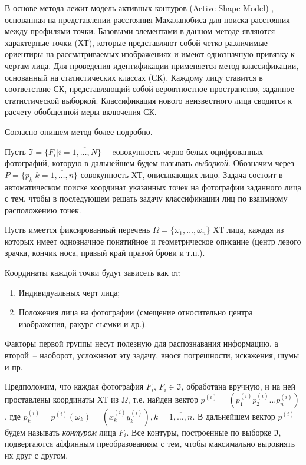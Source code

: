 В основе метода лежит модель активных контуров (Active Shape Model) \cite{main_counters}, основанная на представлении
расстояния Махаланобиса для поиска расстояния между 
профилями точки. Базовыми элементами в данном методе
являются характерные точки (ХТ), которые представляют собой 
четко различимые ориентиры на рассматриваемых изображениях и имеют однозначную привязку к чертам лица.
Для проведения идентификации применяется метод классификации, основанный на статистических классах (СК). Каждому лицу 
ставится в соответствие СК, представляющий собой вероятностное пространство, заданное статистической выборкой.
Класcификация нового неизвестного лица сводится к расчету обобщенной меры включения СК. 

Согласно \cite{harak_points} опишем метод более подробно.

Пусть $ \Im = \lbrace F_i \vert i = \overline{1,\dots, N} \rbrace $~-- cовокупность черно-белых
оцифрованных фотографий, которую в дальнейшем будем называть \textit{выборкой}. Обозначим через\\
$ P=\lbrace p_k \vert k=\overline{1,\dots, n} \rbrace $ совокупность ХТ, описывающих лицо.
Задача состоит в автоматическом поиске координат указанных точек на фотографии заданного лица с тем, чтобы в
последующем решать задачу классификации лиц по взаимному расположению точек.

Пусть имеется фиксированный перечень $ \Omega = \lbrace \omega_1,\dots,\omega_n \rbrace $
ХТ 
лица, каждая из которых имеет однозначное понятийное и геометрическое описание (центр левого зрачка, кончик носа,
правый край правой брови и т.п.). 

Координаты каждой точки будут зависеть как от: \begin{enumerate}
    \item Индивидуальных черт лица;
    \item Положения лица на фотографии 
        (смещение относительно центра изображения, ракурс съемки и др.).
\end{enumerate}

Факторы первой группы несут полезную для распознавания 
информацию, а второй~-- наоборот, усложняют эту задачу, внося 
погрешности, искажения, шумы и пр. 

Предположим, что каждая фотография $F_i$, $F_i\in\Im$, обработана вручную, и на ней проставлены координаты
ХТ из $\Omega$, т.е. найден вектор $p^{(i)} = ( p^{(i)}_1  p^{(i)}_2 \dots p^{(i)}_n) $, где
$p^{(i)}_k = p^{(i)}(\omega_k) = (x^{(i)}_k  y^{(i)}_k), k = \overline{1,\dots,n}$.
В дальнейшем вектор $p^{(i)}$
будем называть \textit{контуром}
лица $F_i$. Все контуры, построенные по выборке $\Im$,
подвергаются аффинным преобразованиям с тем, чтобы максимально выровнять их друг с другом. 

